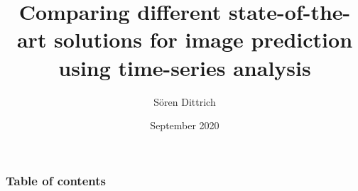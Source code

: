 \documentclass[12pt, a4paper]{beamer}
\title[Bachelorthesis Colloqium]{Comparing different state-of-the-art solutions for image prediction using time-series analysis}
\author{Sören Dittrich} %
\institute[] %
{
Uni Hildesheim \\ %
}
\date{September 2020} %
\begin{document}
 \begin{frame}
 \titlepage %
 \end{frame}
 \begin{frame}
 \frametitle{Table of contents} %
 \tableofcontents %
 \end{frame}


 

 
 
 
 
 
 
 
 
 
 
 
\end{document}
